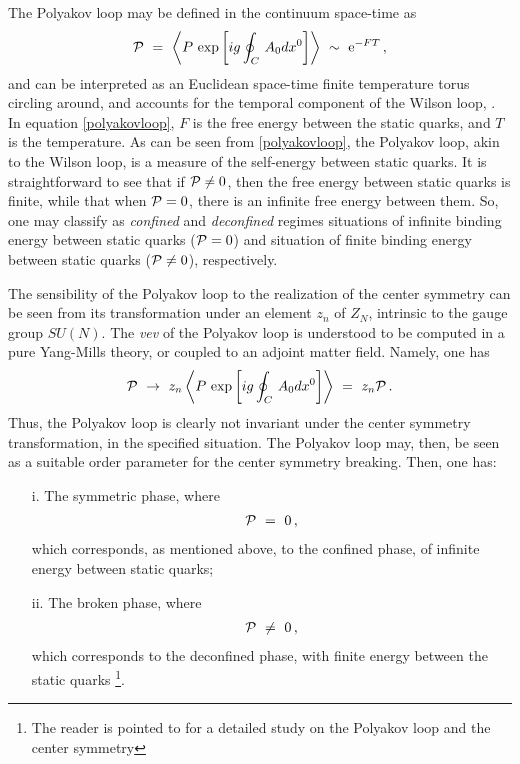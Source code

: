 The Polyakov loop may be defined in the continuum space-time as
\begin{eqnarray}
{\cal P} ~=~ \left\langle  P\,\exp\left[ ig\oint_{C}\, A_{0}dx^{0}  \right] \right\rangle ~\sim~
\mathrm{e}^{-FT}\,,
\label{polyakovloop}
\end{eqnarray}
and can be interpreted as an Euclidean space-time finite temperature torus circling around, and
accounts for the temporal component of the Wilson loop,
\cite{Fukushima:2003fw,Fukushima:thesis}. In equation \eqref{polyakovloop}, $F$ is the free
energy between the static quarks, and $T$ is the temperature.  As can be seen from
\eqref{polyakovloop}, the Polyakov loop, akin to the Wilson loop, is a measure of the
self-energy between static quarks. It is straightforward to see that if ${\cal P}\neq0$, then
the free energy between static quarks is finite, while that when ${\cal P}=0$, there is an
infinite free energy between them. So, one may classify as \emph{confined} and
\emph{deconfined} regimes situations of infinite binding energy between static quarks (${\cal
P}=0$) and situation of finite binding energy between static quarks (${\cal P}\neq0$),
respectively.


The sensibility of the Polyakov loop to the realization of the center symmetry can be seen from
its transformation under an element $z_{n}$ of $Z_{N}$, intrinsic to the gauge group $SU(N)$.
The {\it vev} of the Polyakov loop is understood to be computed in a pure Yang-Mills theory, or
coupled to an adjoint matter field. Namely, one has \cite{Fukushima:2003fw,Fukushima:thesis}
\begin{eqnarray}
{\cal P} ~\to~ z_{n} \left\langle  P\,\exp\left[ ig\oint_{C}\, A_{0}dx^{0}  \right]
\right\rangle ~=~ z_{n}{\cal P} \,.
\end{eqnarray}
Thus, the Polyakov loop is clearly not invariant under the center symmetry transformation, in
the specified situation. The Polyakov loop may, then, be seen as a suitable order parameter for
the center symmetry breaking.
Then, one has:
\begin{itemize}
\item[i.] The symmetric phase, where
\begin{eqnarray}
{\cal P} ~=~ 0\,,
\end{eqnarray}
which corresponds, as mentioned above, to the confined phase, of infinite energy between static
quarks;

\item[ii.] The broken phase, where
\begin{eqnarray}
{\cal P} ~\neq~ 0\,,
\end{eqnarray}
which corresponds to the deconfined phase, with finite energy between the static quarks
\footnote{The reader is pointed to
\cite{Fukushima:2002bk,Fukushima:thesis,Fukushima:2010bq,Bazavov:2009zn,Fukushima:2003fw,Greensite:2011zz}
for a detailed study on the Polyakov loop and the center symmetry}.
\end{itemize}

